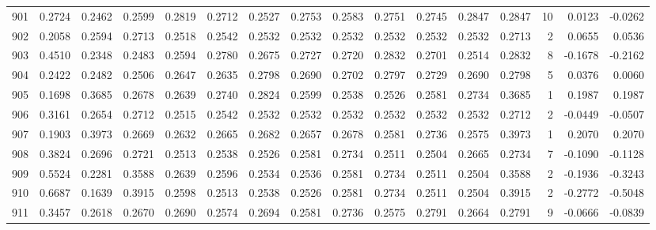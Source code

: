 \begin{tabular}{lrrrrrrrrrrrrrrr}
901 &      0.2724 &  0.2462 &  0.2599 &  0.2819 &  0.2712 &  0.2527 &  0.2753 &  0.2583 &  0.2751 &  0.2745 &   0.2847 &     0.2847 &     10 &                    0.0123 &                    -0.0262 \\
902 &      0.2058 &  0.2594 &  0.2713 &  0.2518 &  0.2542 &  0.2532 &  0.2532 &  0.2532 &  0.2532 &  0.2532 &   0.2532 &     0.2713 &      2 &                    0.0655 &                     0.0536 \\
903 &      0.4510 &  0.2348 &  0.2483 &  0.2594 &  0.2780 &  0.2675 &  0.2727 &  0.2720 &  0.2832 &  0.2701 &   0.2514 &     0.2832 &      8 &                   -0.1678 &                    -0.2162 \\
904 &      0.2422 &  0.2482 &  0.2506 &  0.2647 &  0.2635 &  0.2798 &  0.2690 &  0.2702 &  0.2797 &  0.2729 &   0.2690 &     0.2798 &      5 &                    0.0376 &                     0.0060 \\
905 &      0.1698 &  0.3685 &  0.2678 &  0.2639 &  0.2740 &  0.2824 &  0.2599 &  0.2538 &  0.2526 &  0.2581 &   0.2734 &     0.3685 &      1 &                    0.1987 &                     0.1987 \\
906 &      0.3161 &  0.2654 &  0.2712 &  0.2515 &  0.2542 &  0.2532 &  0.2532 &  0.2532 &  0.2532 &  0.2532 &   0.2532 &     0.2712 &      2 &                   -0.0449 &                    -0.0507 \\
907 &      0.1903 &  0.3973 &  0.2669 &  0.2632 &  0.2665 &  0.2682 &  0.2657 &  0.2678 &  0.2581 &  0.2736 &   0.2575 &     0.3973 &      1 &                    0.2070 &                     0.2070 \\
908 &      0.3824 &  0.2696 &  0.2721 &  0.2513 &  0.2538 &  0.2526 &  0.2581 &  0.2734 &  0.2511 &  0.2504 &   0.2665 &     0.2734 &      7 &                   -0.1090 &                    -0.1128 \\
909 &      0.5524 &  0.2281 &  0.3588 &  0.2639 &  0.2596 &  0.2534 &  0.2536 &  0.2581 &  0.2734 &  0.2511 &   0.2504 &     0.3588 &      2 &                   -0.1936 &                    -0.3243 \\
910 &      0.6687 &  0.1639 &  0.3915 &  0.2598 &  0.2513 &  0.2538 &  0.2526 &  0.2581 &  0.2734 &  0.2511 &   0.2504 &     0.3915 &      2 &                   -0.2772 &                    -0.5048 \\
911 &      0.3457 &  0.2618 &  0.2670 &  0.2690 &  0.2574 &  0.2694 &  0.2581 &  0.2736 &  0.2575 &  0.2791 &   0.2664 &     0.2791 &      9 &                   -0.0666 &                    -0.0839 \\

\end{tabular}
